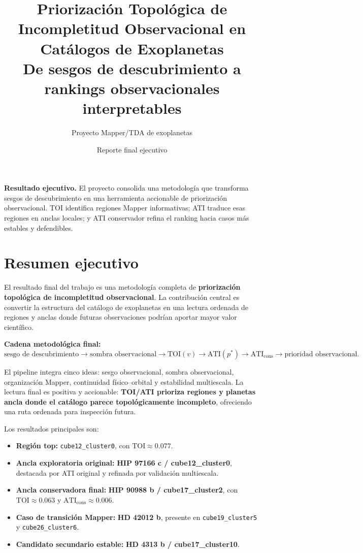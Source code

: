 \documentclass[11pt,letterpaper]{article}
\title{\vspace{-1.2cm}\textbf{Priorización Topológica de Incompletitud Observacional en Catálogos de Exoplanetas}\\[0.25em]
\large De sesgos de descubrimiento a rankings observacionales interpretables}
\author{Proyecto Mapper/TDA de exoplanetas}
\date{Reporte final ejecutivo}
\newcommand{\case}[1]{\textbf{#1}}
\newcommand{\code}[1]{\texttt{#1}}
\begin{document}
\maketitle

\begin{keybox}
\textbf{Resultado ejecutivo.} El proyecto consolida una metodología que transforma sesgos de descubrimiento en una herramienta accionable de priorización observacional. TOI identifica regiones Mapper informativas; ATI traduce esas regiones en anclas locales; y ATI conservador refina el ranking hacia casos más estables y defendibles.
\end{keybox}

\tableofcontents
\newpage

\section{Resumen ejecutivo}

El resultado final del trabajo es una metodología completa de \textbf{priorización topológica de incompletitud observacional}. La contribución central es convertir la estructura del catálogo de exoplanetas en una lectura ordenada de regiones y anclas donde futuras observaciones podrían aportar mayor valor científico.

\begin{resultbox}
\textbf{Cadena metodológica final:}
\[
\text{sesgo de descubrimiento}
\rightarrow
\text{sombra observacional}
\rightarrow
\mathrm{TOI}(v)
\rightarrow
\mathrm{ATI}(p^*)
\rightarrow
\mathrm{ATI}_{\mathrm{cons}}
\rightarrow
\text{prioridad observacional}.
\]
\end{resultbox}

El pipeline integra cinco ideas: sesgo observacional, sombra observacional, organización Mapper, continuidad físico--orbital y estabilidad multiescala. La lectura final es positiva y accionable: \textbf{TOI/ATI prioriza regiones y planetas ancla donde el catálogo parece topológicamente incompleto}, ofreciendo una ruta ordenada para inspección futura.

Los resultados principales son:

\begin{itemize}[leftmargin=1.4em]
    \item \textbf{Región top:} \code{cube12\_cluster0}, con $\mathrm{TOI}\approx 0.077$.
    \item \textbf{Ancla exploratoria original:} \case{HIP 97166 c / cube12\_cluster0}, destacada por ATI original y refinada por validación multiescala.
    \item \textbf{Ancla conservadora final:} \case{HIP 90988 b / cube17\_cluster2}, con $\mathrm{TOI}\approx 0.063$ y $\mathrm{ATI}_{\mathrm{cons}}\approx 0.006$.
    \item \textbf{Caso de transición Mapper:} \case{HD 42012 b}, presente en \code{cube19\_cluster5} y \code{cube26\_cluster6}.
    \item \textbf{Candidato secundario estable:} \case{HD 4313 b / cube17\_cluster10}.
\end{itemize}
\end{document}
